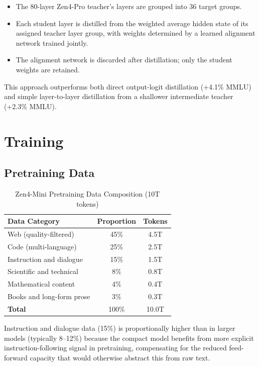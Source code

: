 \documentclass[11pt,a4paper]{article}
\begin{document}
\begin{itemize}
    \item The 80-layer Zen4-Pro teacher's layers are grouped into 36 target groups.
    \item Each student layer is distilled from the weighted average hidden state of its
    assigned teacher layer group, with weights determined by a learned alignment network
    trained jointly.
    \item The alignment network is discarded after distillation; only the student weights
    are retained.
\end{itemize}

This approach outperforms both direct output-logit distillation (+4.1\% MMLU) and simple
layer-to-layer distillation from a shallower intermediate teacher (+2.3\% MMLU).

\section{Training}

\subsection{Pretraining Data}

\begin{table}[H]
\centering
\begin{tabular}{lcc}
\toprule
\textbf{Data Category} & \textbf{Proportion} & \textbf{Tokens} \\
\midrule
Web (quality-filtered)         & 45\%  & 4.5T \\
Code (multi-language)          & 25\%  & 2.5T \\
Instruction and dialogue       & 15\%  & 1.5T \\
Scientific and technical       & 8\%   & 0.8T \\
Mathematical content           & 4\%   & 0.4T \\
Books and long-form prose      & 3\%   & 0.3T \\
\midrule
\textbf{Total}                 & 100\% & 10.0T \\
\bottomrule
\end{tabular}
\caption{Zen4-Mini Pretraining Data Composition (10T tokens)}
\end{table}

Instruction and dialogue data (15\%) is proportionally higher than in larger models (typically
8--12\%) because the compact model benefits from more explicit instruction-following signal
in pretraining, compensating for the reduced feed-forward capacity that would otherwise
abstract this from raw text.
\end{document}
